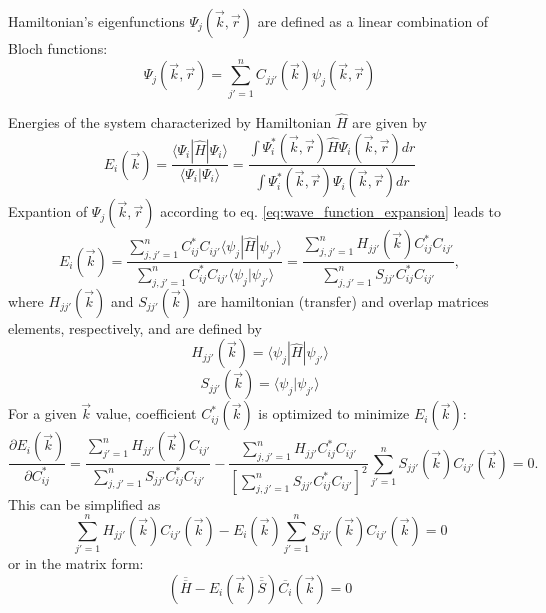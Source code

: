 Hamiltonian's eigenfunctions $\Psi_j(\vec{k}, \vec{r})$ are defined as a linear combination of Bloch functions:
\begin{equation} \label{eq:wave_function_expansion}
	\Psi_j(\vec{k}, \vec{r}) = \sum_{j'=1}^{n} C_{jj'}(\vec{k}) \psi_j(\vec{k}, \vec{r})
\end{equation}

Energies of the system characterized by Hamiltonian $\hat{H}$ are given by
\begin{equation}
	E_i(\vec{k}) = \frac{\langle \Psi_i | \hat{H} | \Psi_i \rangle}{\langle \Psi_i | \Psi_i \rangle} = \frac{\int \Psi^*_i(\vec{k}, \vec{r}) \hat{H} \Psi_i(\vec{k}, \vec{r}) dr}{\int \Psi^*_i(\vec{k}, \vec{r}) \Psi_i(\vec{k}, \vec{r}) dr}
\end{equation}
Expantion of $\Psi_j(\vec{k}, \vec{r})$ according to eq. \ref{eq:wave_function_expansion} leads to
\begin{equation}
	E_i(\vec{k}) = \frac{\sum\limits_{j,j'=1}^{n} C^*_{ij} C_{ij'} \langle \psi_j | \hat{H} | \psi_{j'} \rangle}{\sum\limits_{j,j'=1}^{n} C^*_{ij} C_{ij'} \langle \psi_j | \psi_{j'} \rangle} = \frac{\sum\limits_{j,j'=1}^{n} H_{jj'}(\vec{k}) C^*_{ij} C_{ij'}}{\sum\limits_{j,j'=1}^{n} S_{jj'} C^*_{ij} C_{ij'}},
\end{equation} 
where $H_{jj'}(\vec{k})$ and $S_{jj'}(\vec{k})$ are hamiltonian (transfer) and overlap matrices elements, respectively, and are defined by
\begin{equation} \label{eq:h_matrix}
	H_{jj'}(\vec{k}) = \langle \psi_j | \hat{H} | \psi_{j'} \rangle
\end{equation}
\begin{equation} \label{eq:s_matrix}
	S_{jj'}(\vec{k}) = \langle \psi_j | \psi_{j'} \rangle
\end{equation}
For a given $\vec{k}$ value, coefficient $C^*_{ij}(\vec{k})$ is optimized to minimize $E_i(\vec{k})$:
\begin{equation}
	\frac{\partial E_i (\vec{k})}{\partial C^*_{ij}} = \frac{\sum\limits_{j'=1}^{n} H_{jj'}(\vec{k}) C_{ij'}}{\sum\limits_{j,j'=1}^{n} S_{jj'} C^*_{ij} C_{ij'}} - \frac{\sum\limits_{j,j'=1}^{n} H_{jj'} C^*_{ij} C_{ij'}}{[\sum\limits_{j,j'=1}^{n} S_{jj'} C^*_{ij} C_{ij'}]^2} \sum\limits_{j'=1}^{n} S_{jj'}(\vec{k}) C_{ij'}(\vec{k}) = 0.
\end{equation}
This can be simplified as 
\begin{equation}
	\sum_{j'=1}^{n} H_{jj'}(\vec{k}) C_{ij'}(\vec{k}) - E_i(\vec{k}) \sum_{j'=1}^{n} S_{jj'}(\vec{k}) C_{ij'}(\vec{k}) = 0
\end{equation}
or in the matrix form:
\begin{equation} \label{eq:secular}
	(\overline{\overline{H}} - E_i(\vec{k})\overline{\overline{S}})\overline{C_i}(\vec{k}) = 0
\end{equation}

